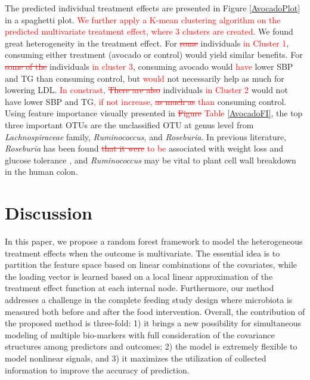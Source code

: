 \documentclass[smallextended]{svjour3}
\newcommand{\bg}[1]{\textcolor{red}{#1}}
\begin{document}
The predicted individual treatment effects are presented in Figure \ref{AvocadoPlot} in a spaghetti plot. \bg{We further apply a K-mean clustering algorithm on the predicted multivariate treatment effect, where 3 clusters are created.} We found great heterogeneity in the treatment effect. For \bg{\st{some}} individuals \bg{in Cluster 1}, consuming either treatment (avocado or control) would yield similar benefits. For \bg{\st{some of the}} individuals \bg{in cluster 3}, consuming avocado would \bg{have} lower SBP and TG than consuming control, but \bg{would} not necessarily help as much for lowering LDL. \bg{In constrast, \st{There are also}} individuals \bg{in Cluster 2} would not have lower SBP and TG\bg{, if not increase, \st{as much as} than} consuming control. Using feature importance visually presented in \bg{\st{Figure} Table} \ref{AvocadoFI}, the top three important OTUs are the unclassified OTU at genus level from \textit{Lachnospiraceae} family, \textit{Ruminococcus}, and \textit{Roseburia}. In previous literature, \textit{Roseburia} has been found \bg{\st{that it were} to be} associated with weight loss and glucose tolerance \citep{ryan2014fxr}, and \textit{Ruminococcus} may be vital to plant cell wall breakdown in the human colon\citep{ze2012ruminococcus}.


\section{Discussion}\label{Disc}

In this paper, we propose a random forest framework to model the heterogeneous treatment effects when the outcome is multivariate. The essential idea is to partition the feature space based on linear combinations of the covariates, while the loading vector is learned based on a local linear approximation of the treatment effect function at each internal node. Furthermore, our method addresses a challenge in the complete feeding study design where microbiota is measured both before and after the food intervention. Overall, the contribution of the proposed method is three-fold: 1) it brings a new possibility for simultaneous modeling of multiple bio-markers with full consideration of the covariance structures among predictors and outcomes; 2) the model is extremely flexible to model nonlinear signals, and 3) it maximizes the utilization of collected information to improve the accuracy of prediction. 
\end{document}
